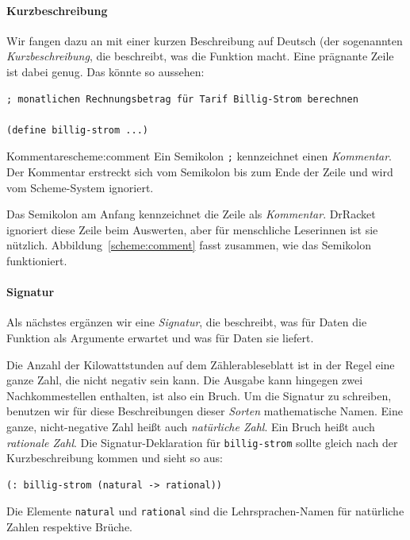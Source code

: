 \paragraph{Kurzbeschreibung}
Wir fangen dazu an mit einer kurzen Beschreibung auf Deutsch (der
sogenannten \textit{Kurzbeschreibung}, die
beschreibt, was die Funktion macht.  Eine prägnante Zeile ist dabei
genug.  Das könnte so aussehen:
%
\begin{verbatim}
; monatlichen Rechnungsbetrag für Tarif Billig-Strom berechnen

(define billig-strom ...)
\end{verbatim}
%
\begin{feature}{Kommentare}{scheme:comment}
  Ein Semikolon \texttt{;} kennzeichnet einen 
  \textit{Kommentar}.  Der Kommentar erstreckt sich
  vom Semikolon bis zum Ende der Zeile und wird vom Scheme-System
  ignoriert.
\end{feature}
%
Das Semikolon am Anfang kennzeichnet die Zeile als
\textit{Kommentar}. DrRacket ignoriert diese Zeile
beim Auswerten, aber für menschliche Leserinnen ist sie nützlich.
Abbildung~\ref{scheme:comment} fasst zusammen, wie das Semikolon
funktioniert.

\paragraph{Signatur} Als nächstes ergänzen wir eine \textit{Signatur}, die
beschreibt, was für Daten die Funktion als Argumente erwartet und was
für Daten sie liefert.

Die Anzahl der Kilowattstunden auf dem Zählerableseblatt ist in der
Regel eine ganze Zahl, die nicht negativ sein kann.  Die Ausgabe kann
hingegen zwei Nachkommestellen enthalten, ist also ein Bruch.  Um die
Signatur zu schreiben, benutzen wir für diese Beschreibungen dieser
\textit{Sorten} mathematische Namen.  Eine ganze,
nicht-negative Zahl heißt auch \textit{natürliche
  Zahl}.  Ein Bruch heißt auch
\textit{rationale Zahl}.  Die
Signatur-Deklaration für \texttt{billig-strom} sollte gleich nach der
Kurzbeschreibung kommen und sieht so aus:
%
\begin{verbatim}
(: billig-strom (natural -> rational))
\end{verbatim}
%
Die Elemente \texttt{natural} und \texttt{rational} sind die
Lehrsprachen-Namen für natürliche Zahlen respektive Brüche.

